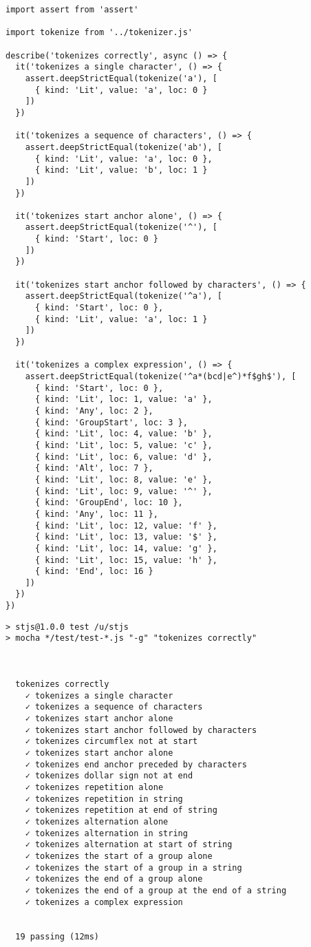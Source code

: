 \documentclass[krantzl]{krantz}
\begin{document}
\begin{lstlisting}[frame=single,frameround=tttt]
import assert from 'assert'

import tokenize from '../tokenizer.js'

describe('tokenizes correctly', async () => {
  it('tokenizes a single character', () => {
    assert.deepStrictEqual(tokenize('a'), [
      { kind: 'Lit', value: 'a', loc: 0 }
    ])
  })

  it('tokenizes a sequence of characters', () => {
    assert.deepStrictEqual(tokenize('ab'), [
      { kind: 'Lit', value: 'a', loc: 0 },
      { kind: 'Lit', value: 'b', loc: 1 }
    ])
  })

  it('tokenizes start anchor alone', () => {
    assert.deepStrictEqual(tokenize('^'), [
      { kind: 'Start', loc: 0 }
    ])
  })

  it('tokenizes start anchor followed by characters', () => {
    assert.deepStrictEqual(tokenize('^a'), [
      { kind: 'Start', loc: 0 },
      { kind: 'Lit', value: 'a', loc: 1 }
    ])
  })

  it('tokenizes a complex expression', () => {
    assert.deepStrictEqual(tokenize('^a*(bcd|e^)*f$gh$'), [
      { kind: 'Start', loc: 0 },
      { kind: 'Lit', loc: 1, value: 'a' },
      { kind: 'Any', loc: 2 },
      { kind: 'GroupStart', loc: 3 },
      { kind: 'Lit', loc: 4, value: 'b' },
      { kind: 'Lit', loc: 5, value: 'c' },
      { kind: 'Lit', loc: 6, value: 'd' },
      { kind: 'Alt', loc: 7 },
      { kind: 'Lit', loc: 8, value: 'e' },
      { kind: 'Lit', loc: 9, value: '^' },
      { kind: 'GroupEnd', loc: 10 },
      { kind: 'Any', loc: 11 },
      { kind: 'Lit', loc: 12, value: 'f' },
      { kind: 'Lit', loc: 13, value: '$' },
      { kind: 'Lit', loc: 14, value: 'g' },
      { kind: 'Lit', loc: 15, value: 'h' },
      { kind: 'End', loc: 16 }
    ])
  })
})
\end{lstlisting}



\begin{lstlisting}[frame=single,frameround=tttt]
> stjs@1.0.0 test /u/stjs
> mocha */test/test-*.js "-g" "tokenizes correctly"



  tokenizes correctly
    ✓ tokenizes a single character
    ✓ tokenizes a sequence of characters
    ✓ tokenizes start anchor alone
    ✓ tokenizes start anchor followed by characters
    ✓ tokenizes circumflex not at start
    ✓ tokenizes start anchor alone
    ✓ tokenizes end anchor preceded by characters
    ✓ tokenizes dollar sign not at end
    ✓ tokenizes repetition alone
    ✓ tokenizes repetition in string
    ✓ tokenizes repetition at end of string
    ✓ tokenizes alternation alone
    ✓ tokenizes alternation in string
    ✓ tokenizes alternation at start of string
    ✓ tokenizes the start of a group alone
    ✓ tokenizes the start of a group in a string
    ✓ tokenizes the end of a group alone
    ✓ tokenizes the end of a group at the end of a string
    ✓ tokenizes a complex expression


  19 passing (12ms)
\end{lstlisting}
\end{document}
